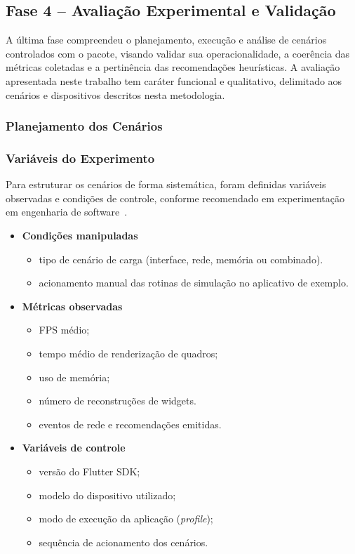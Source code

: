 \subsection{Fase 4 – Avaliação Experimental e Validação}

A última fase compreendeu o planejamento, execução e análise de cenários controlados com o pacote, visando validar sua operacionalidade, a coerência das métricas coletadas e a pertinência das recomendações heurísticas. A avaliação apresentada neste trabalho tem caráter funcional e qualitativo, delimitado aos cenários e dispositivos descritos nesta metodologia.

\subsubsection{Planejamento dos Cenários}
\subsubsection{Variáveis do Experimento}

Para estruturar os cenários de forma sistemática, foram definidas variáveis observadas e condições de controle, conforme recomendado em experimentação em engenharia de software~\cite{wohlin2012}.

\begin{itemize}

\item \textbf{Condições manipuladas}
\begin{itemize}
\item tipo de cenário de carga (interface, rede, memória ou combinado).
\item acionamento manual das rotinas de simulação no aplicativo de exemplo.
\end{itemize}

\item \textbf{Métricas observadas}
\begin{itemize}
\item FPS médio;
\item tempo médio de renderização de quadros;
\item uso de memória;
\item número de reconstruções de widgets.
\item eventos de rede e recomendações emitidas.
\end{itemize}

\item \textbf{Variáveis de controle}
\begin{itemize}
\item versão do Flutter SDK;
\item modelo do dispositivo utilizado;
\item modo de execução da aplicação (\textit{profile});
\item sequência de acionamento dos cenários.
\end{itemize}

\end{itemize}

